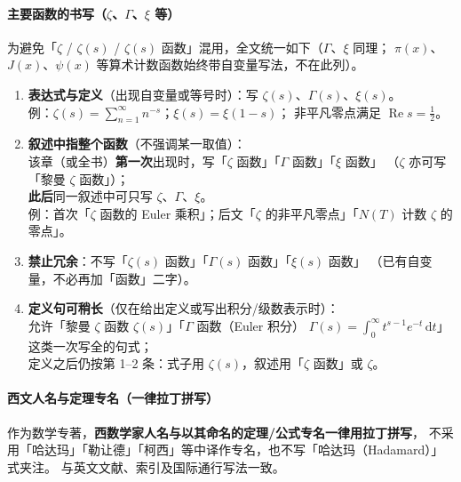 \paragraph{主要函数的书写（$\zeta$、$\Gamma$、$\xi$ 等）}
为避免「$\zeta$ / $\zeta(s)$ / $\zeta(s)$ 函数」混用，全文统一如下（$\Gamma$、$\xi$ 同理；
$\pi(x)$、$J(x)$、$\psi(x)$ 等算术计数函数始终带自变量写法，不在此列）。

\begin{enumerate}[leftmargin=2em,itemsep=0.35em]
  \item \textbf{表达式与定义}（出现自变量或等号时）：写 $\zeta(s)$、$\Gamma(s)$、$\xi(s)$。\\
        例：$\zeta(s)=\sum_{n=1}^\infty n^{-s}$；$\xi(s)=\xi(1-s)$；
        非平凡零点满足 $\operatorname{Re}s=\frac{1}{2}$。
  \item \textbf{叙述中指整个函数}（不强调某一取值）：\\
        该章（或全书）\textbf{第一次}出现时，写「$\zeta$ 函数」「$\Gamma$ 函数」「$\xi$ 函数」
        （$\zeta$ 亦可写「黎曼 $\zeta$ 函数」）；\\
        \textbf{此后}同一叙述中可只写 $\zeta$、$\Gamma$、$\xi$。\\
        例：首次「$\zeta$ 函数的 Euler 乘积」；后文「$\zeta$ 的非平凡零点」「$N(T)$ 计数 $\zeta$ 的零点」。
  \item \textbf{禁止冗余}：不写「$\zeta(s)$ 函数」「$\Gamma(s)$ 函数」「$\xi(s)$ 函数」
        （已有自变量，不必再加「函数」二字）。
  \item \textbf{定义句可稍长}（仅在给出定义或写出积分/级数表示时）：\\
        允许「黎曼 $\zeta$ 函数 $\zeta(s)$」「$\Gamma$ 函数（Euler 积分）
        $\Gamma(s)=\int_0^\infty t^{s-1}e^{-t}\,\mathrm{d}t$」这类一次写全的句式；\\
        定义之后仍按第 1--2 条：式子用 $\zeta(s)$，叙述用「$\zeta$ 函数」或 $\zeta$。
\end{enumerate}

\paragraph{西文人名与定理专名（一律拉丁拼写）}
作为数学专著，\textbf{西数学家人名与以其命名的定理/公式专名一律用拉丁拼写}，
不采用「哈达玛」「勒让德」「柯西」等中译作专名，也不写「哈达玛（Hadamard）」式夹注。
与英文文献、索引及国际通行写法一致。

